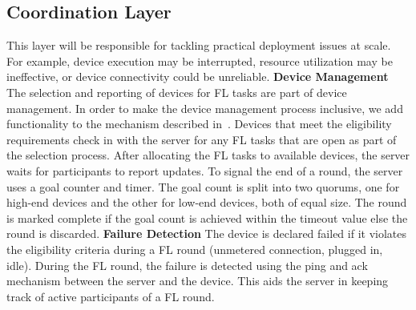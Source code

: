     \subsection{Coordination Layer}
        This layer will be responsible for tackling practical deployment issues at scale. For example, device execution may be interrupted, resource utilization may be ineffective, or device connectivity could be unreliable. \newline \newline
        \textbf{Device Management} The selection and reporting of devices for FL tasks are part of device management. In order to make the device management process inclusive, we add functionality to the mechanism described in~\cite{DBLP:journals/corr/abs-1902-01046}. Devices that meet the eligibility requirements check in with the server for any FL tasks that are open as part of the selection process. After allocating the FL tasks to available devices, the server waits for participants to report updates. To signal the end of a round, the server uses a goal counter and timer. The goal count is split into two quorums, one for high-end devices and the other for low-end devices, both of equal size. The round is marked complete if the goal count is achieved within the timeout value else the round is discarded. 
        \newline \newline
        \textbf{Failure Detection} The device is declared failed if it violates the eligibility criteria during a FL round (unmetered connection, plugged in, idle). During the FL round, the failure is detected using the ping and ack mechanism between the server and the device. This aids the server in keeping track of active participants of a FL round.
            